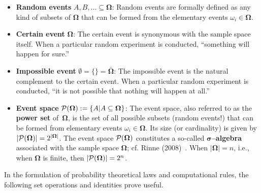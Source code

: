\begin{itemize}
\item \textbf{Random events} $A, B, \ldots \subseteq 
\boldsymbol{\Omega}$: Random events are formally defined as any 
kind of subsets of $\boldsymbol{\Omega}$ that can be formed from 
the elementary events $\omega_{i} \in \boldsymbol{\Omega}$.

\item \textbf{Certain event} $\boldsymbol{\Omega}$: The certain
event is synonymous with the sample space itself. When a particular 
random experiment is conducted, ``something will happen for sure.''

\item \textbf{Impossible event} $\emptyset=\{\}
= \bar{\boldsymbol{\Omega}}$: The impossible event is the natural 
complement to the certain event. When a particular random 
experiment is conducted, ``it is not possible that nothing will 
happen at all.''

\item \textbf{Event space} ${\cal P}(\boldsymbol{\Omega}) := \{A|A 
\subseteq \boldsymbol{\Omega}\}$: The event space, also referred 
to as the \textbf{power set} of~$\boldsymbol{\Omega}$, is the set
of all possible subsets (random events!) that can be formed from 
elementary events $\omega_{i} \in \boldsymbol{\Omega}$. Its size 
(or cardinality) is given by $|{\cal P}(\boldsymbol{\Omega})| = 
2^{|\boldsymbol{\Omega}|}$. The event space 
${\cal P}(\boldsymbol{\Omega})$ constitutes a so-called
\textbf{$\boldsymbol{\sigma}$--algebra} associated with the sample
space $\boldsymbol{\Omega}$; cf. Rinne (2008)~.
When $|\boldsymbol{\Omega}|=n$, i.e., when $\boldsymbol{\Omega}$ is 
finite, then $|{\cal P}(\boldsymbol{\Omega})|=2^{n}$.

\end{itemize}
%
In the formulation of probability theoretical laws and 
computational rules, the following set operations and identities 
prove useful.

